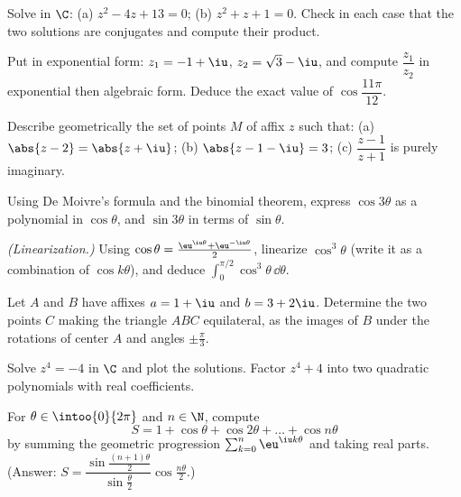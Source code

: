\begin{exercise}[$\star$]\label{exo:tle:complex:2}
Solve in $\C$: (a) $z^2 - 4z + 13 = 0$; (b) $z^2 + z + 1 = 0$. Check in each
case that the two solutions are conjugates and compute their product.
\end{exercise}

\begin{exercise}[$\star$]\label{exo:tle:complex:3}
Put in exponential form: $z_1 = -1 + \iu$, $z_2 = \sqrt3 - \iu$, and compute
$\dfrac{z_1}{z_2}$ in exponential then algebraic form. Deduce the exact
value of $\cos\dfrac{11\pi}{12}$.
\end{exercise}

\begin{exercise}[$\star\star$]\label{exo:tle:complex:4}
Describe geometrically the set of points $M$ of affix $z$ such that:
(a) $\abs{z - 2} = \abs{z + \iu}$;\quad
(b) $\abs{z - 1 - \iu} = 3$;\quad
(c) $\dfrac{z - 1}{z + 1}$ is purely imaginary.
\end{exercise}

\begin{exercise}[$\star\star$]\label{exo:tle:complex:5}
Using De Moivre's formula and the binomial theorem, express $\cos 3\theta$
as a polynomial in $\cos\theta$, and $\sin 3\theta$ in terms of
$\sin\theta$.
\end{exercise}

\begin{exercise}[$\star\star$]\label{exo:tle:complex:6}
\emph{(Linearization.)} Using
$\cos\theta = \frac{\eu^{\iu\theta} + \eu^{-\iu\theta}}{2}$, linearize
$\cos^3\theta$ (write it as a combination of $\cos k\theta$), and deduce
$\displaystyle\int_0^{\pi/2}\cos^3\theta\,\dd\theta$.
\end{exercise}

\begin{exercise}[$\star\star$]\label{exo:tle:complex:7}
Let $A$ and $B$ have affixes $a = 1 + \iu$ and $b = 3 + 2\iu$. Determine the
two points $C$ making the triangle $ABC$ equilateral, as the images of $B$
under the rotations of center $A$ and angles $\pm\frac{\pi}{3}$.
\end{exercise}

\begin{exercise}[$\star\star\star$]\label{exo:tle:complex:8}
Solve $z^4 = -4$ in $\C$ and plot the solutions. Factor
$z^4 + 4$ into two quadratic polynomials with real coefficients.
\end{exercise}

\begin{exercise}[$\star\star\star$]\label{exo:tle:complex:9}
For $\theta \in \intoo{0}{2\pi}$ and $n \in \N$, compute
\[
S = 1 + \cos\theta + \cos 2\theta + \dots + \cos n\theta
\]
by summing the geometric progression
$\sum_{k=0}^n \eu^{\iu k\theta}$ and taking real parts. (Answer:
$S = \dfrac{\sin\frac{(n+1)\theta}{2}}{\sin\frac{\theta}{2}}
\cos\frac{n\theta}{2}$.)
\end{exercise}

